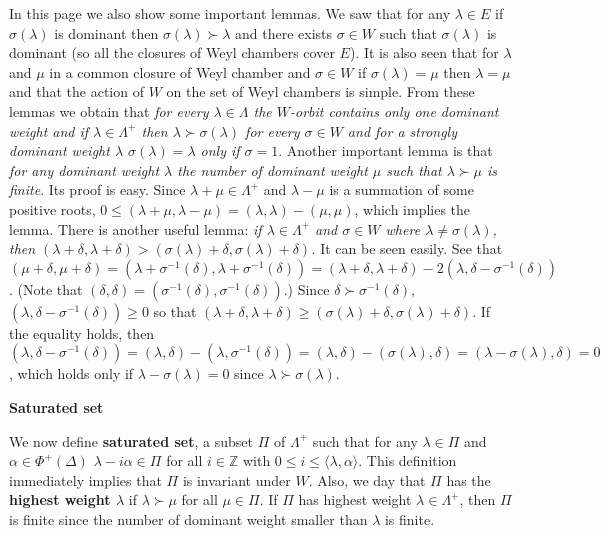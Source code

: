 \documentclass{article}
\newcommand{\InZ}{\mathbb{Z}}
\begin{document}
In this page we also show some important lemmas.
We saw that for any $\lambda \in E$ if $\sigma(\lambda)$ is dominant then $\sigma(\lambda) \succ \lambda$ and there exists $\sigma \in W$ such that $\sigma(\lambda)$ is dominant (so all the closures of Weyl chambers cover $E$).
It is also seen that for $\lambda$ and $\mu$ in a common closure of Weyl chamber and $\sigma \in W$ if $\sigma(\lambda) = \mu$ then $\lambda = \mu$ and that the action of $W$ on the set of Weyl chambers is simple.
From these lemmas we obtain that \textit{for every $\lambda \in \Lambda$ the $W$-orbit contains only one dominant weight and if $\lambda \in \Lambda^+$ then $\lambda \succ \sigma(\lambda)$ for every $\sigma \in W$ and for a strongly dominant weight $\lambda$ $\sigma(\lambda) = \lambda$ only if $\sigma = 1$}.
Another important lemma is that \textit{for any dominant weight $\lambda$ the number of dominant weight $\mu$ such that $\lambda \succ \mu$ is finite}.
Its proof is easy.
Since $\lambda + \mu \in \Lambda^+$ and $\lambda - \mu$ is a summation of some positive roots, $0 \le (\lambda + \mu, \lambda - \mu) = (\lambda, \lambda) - (\mu, \mu)$, which implies the lemma.
There is another useful lemma: \textit{if $\lambda \in \Lambda^+$ and $\sigma \in W$ where $\lambda \ne \sigma(\lambda)$, then $(\lambda + \delta, \lambda + \delta) > (\sigma(\lambda) + \delta, \sigma(\lambda) + \delta)$.}
It can be seen easily.
See that $(\mu + \delta, \mu + \delta) = (\lambda + \sigma^{-1}(\delta), \lambda + \sigma^{-1}(\delta)) = (\lambda + \delta, \lambda + \delta) - 2(\lambda, \delta - \sigma^{-1}(\delta))$.
(Note that $(\delta, \delta) = (\sigma^{-1}(\delta), \sigma^{-1}(\delta))$.)
Since $\delta \succ \sigma^{-1}(\delta)$, $(\lambda, \delta - \sigma^{-1}(\delta)) \ge 0$ so that $(\lambda + \delta, \lambda + \delta) \ge (\sigma(\lambda) + \delta, \sigma(\lambda) + \delta)$.
If the equality holds, then $(\lambda, \delta - \sigma^{-1}(\delta)) = (\lambda, \delta) - (\lambda, \sigma^{-1}(\delta)) = (\lambda, \delta) - (\sigma(\lambda), \delta) = (\lambda - \sigma(\lambda), \delta) = 0$, which holds only if $\lambda -\sigma(\lambda) = 0$ since $\lambda \succ \sigma(\lambda)$.

\newpage

\textbf{Saturated set}

We now define \textbf{saturated set}, a subset $\Pi$ of $\Lambda^+$ such that for any $\lambda \in \Pi$ and $\alpha \in \Phi^+(\Delta)$ $\lambda - i\alpha \in \Pi$ for all $i \in \InZ$ with $0 \le i \le \langle \lambda, \alpha \rangle$.
This definition immediately implies that $\Pi$ is invariant under $W$.
Also, we day that $\Pi$ has the \textbf{highest weight $\lambda$} if $\lambda \succ \mu$ for all $\mu \in \Pi$.
If $\Pi$ has highest weight $\lambda \in \Lambda^+$, then $\Pi$ is finite since the number of dominant weight smaller than $\lambda$ is finite.
\end{document}
